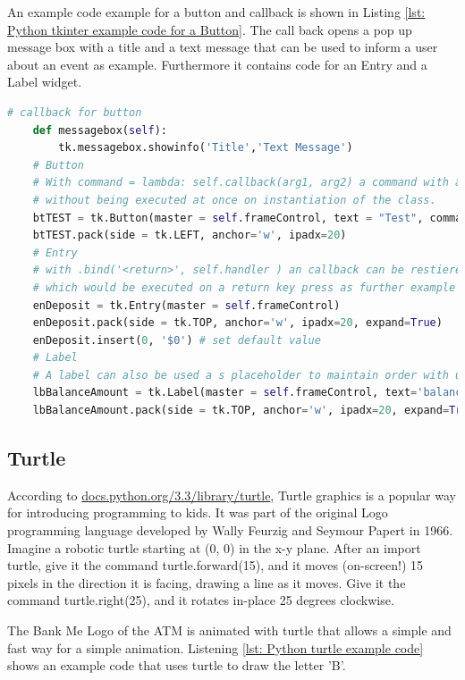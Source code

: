 An example code example for a button and callback is shown in Listing \ref{lst: Python tkinter example code for a Button}. The call back opens a pop up message box with a title and a text message that can be used to inform a user about an event as example. Furthermore it contains code for an Entry and a Label widget.
\begin{lstlisting}[style=PythonStyle, language=Python, caption={Python tkinter example code for a Button with callabck that opens a message box.},label=lst: Python tkinter example code for a Button]
	# callback for button 
    def messagebox(self): 
		tk.messagebox.showinfo('Title','Text Message')
	# Button
	# With command = lambda: self.callback(arg1, arg2) a command with arguments is possible
	# without being executed at once on instantiation of the class.
    btTEST = tk.Button(master = self.frameControl, text = "Test", command = self.messagebox) 
    btTEST.pack(side = tk.LEFT, anchor='w', ipadx=20)   
    # Entry
    # with .bind('<return>', self.handler ) an callback can be restiered 
    # which would be executed on a return key press as further example
    enDeposit = tk.Entry(master = self.frameControl)
    enDeposit.pack(side = tk.TOP, anchor='w', ipadx=20, expand=True)
    enDeposit.insert(0, '$0') # set default value  
    # Label
    # A label can also be used a s placeholder to maintain order with using of .pack()
    lbBalanceAmount = tk.Label(master = self.frameControl, text='balance')
    lbBalanceAmount.pack(side = tk.TOP, anchor='w', ipadx=20, expand=True)
\end{lstlisting}


\subsection{Turtle}\label{subsec: Turtle}
According to \href{https://docs.python.org/3.3/library/turtle.html?highlight=turtle}{docs.python.org/3.3/library/turtle}, Turtle graphics is a popular way for introducing programming to kids. It was part of the original Logo programming language developed by Wally Feurzig and Seymour Papert in 1966.
Imagine a robotic turtle starting at (0, 0) in the x-y plane. After an import turtle, give it the command turtle.forward(15), and it moves (on-screen!) 15 pixels in the direction it is facing, drawing a line as it moves. Give it the command turtle.right(25), and it rotates in-place 25 degrees clockwise.

The Bank Me Logo of the ATM is animated with turtle that allows a simple and fast way for a simple animation. Listening \ref{lst: Python turtle example code} shows an example code that uses turtle to draw the letter 'B'.

